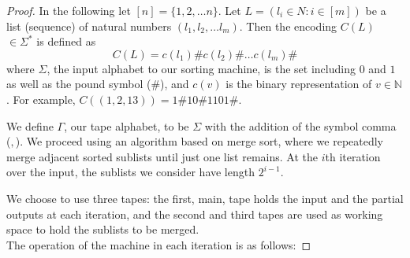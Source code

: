 \documentclass[english]{article}
\theoremstyle{plain}
\theoremstyle{definition}
\theoremstyle{plain}
\begin{document}
\begin{proof}
  In the following let $[n] = \{1,2,\ldots n\}$. Let $L = (l_i \in N:
  i \in [m])$ be a list (sequence) of natural numbers $(l_1,l_2,
  \ldots l_m)$. Then the encoding $C(L)$ $\in \Sigma^*$ is defined as
\[
C(L) = c(l_1) \# c(l_2) \# \ldots c(l_m) \#
\]
  where $\Sigma$, the input alphabet to our sorting machine, is the
  set including $0$ and $1$ as well as the pound symbol ($\#$), and
  $c(v)$ is the binary representation of $v \in \mathbb{N}$. For
  example, $C((1,2,13))=1\#10\#1101\#$.

  We define $\Gamma$, our tape alphabet, to be $\Sigma$ with the
  addition of the symbol comma ($,$). We proceed using an algorithm
  based on merge sort, where we repeatedly merge adjacent sorted
  sublists until just one list remains. At the $i$th iteration over
  the input, the sublists we consider have length $2^{i-1}$.

  We choose to use three tapes: the first, main, tape holds the input
  and the partial outputs at each iteration, and the second and third
  tapes are used as working space to hold the sublists to be merged. \\

  The operation of the machine in each iteration is as follows:


\end{proof}
\end{document}

